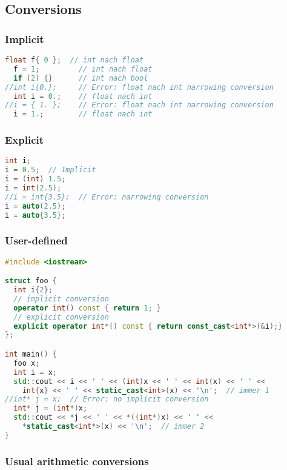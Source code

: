 \documentclass[10pt,twocolumn]{scrartcl}
\begin{document}
\subsection{Conversions}

\subsubsection{Implicit}

\begin{lstlisting}[language=C++]
  float f{ 0 };  // int nach float
  f = 1;         // int nach float
  if (2) {}      // int nach bool
//int i{0.};     // Error: float nach int narrowing conversion
  int i = 0.;    // float nach int
//i = { 1. };    // Error: float nach int narrowing conversion
  i = 1.;        // float nach int
\end{lstlisting}

\subsubsection{Explicit}

\begin{lstlisting}[language=C++]
int i;
i = 0.5;  // Implicit
i = (int) 1.5;
i = int(2.5);
//i = int{3.5};  // Error: narrowing conversion
i = auto(2.5);
i = auto{3.5};
\end{lstlisting}

\subsubsection{User-defined}

\begin{lstlisting}[language=C++]
#include <iostream>

struct foo {
  int i{2};
  // implicit conversion
  operator int() const { return 1; }
  // explicit conversion
  explicit operator int*() const { return const_cast<int*>(&i);}
};

int main() {
  foo x;
  int i = x;
  std::cout << i << ' ' << (int)x << ' ' << int(x) << ' ' <<
    int{x} << ' ' << static_cast<int>(x) << '\n';  // immer 1
//int* j = x;  // Error: no implicit conversion
  int* j = (int*)x;
  std::cout << *j << ' ' << *((int*)x) << ' ' <<
    *static_cast<int*>(x) << '\n';  // immer 2
}
\end{lstlisting}

\subsubsection{Usual arithmetic conversions}
\end{document}
